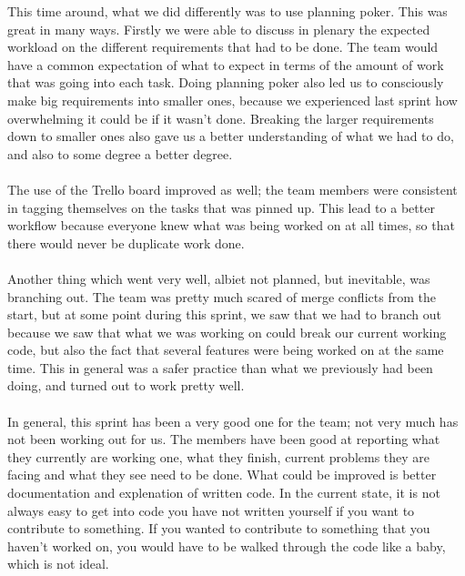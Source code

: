\documentclass{article}
\begin{document}
\maketitle

This time around, what we did differently was to use planning poker. This was great in many ways. Firstly we were able to discuss in plenary the expected workload on the different requirements that had to be done. The team would have a common expectation of what to expect in terms of the amount of work that was going into each task. Doing planning poker also led us to consciously make big requirements into smaller ones, because we experienced last sprint how overwhelming it could be if it wasn't done. Breaking the larger requirements down to smaller ones also gave us a better understanding of what we had to do, and also to some degree a better degree.\\\\
The use of the Trello board improved as well; the team members were consistent in tagging themselves on the tasks that was pinned up. This lead to a better workflow because everyone knew what was being worked on at all times, so that there would never be duplicate work done.\\\\
Another thing which went very well, albiet not planned, but inevitable, was branching out. The team was pretty much scared of merge conflicts from the start, but at some point during this sprint, we saw that we had to branch out because we saw that what we was working on could break our current working code, but also the fact that several features were being worked on at the same time. This in general was a safer practice than what we previously had been doing, and turned out to work pretty well.\\\\
In general, this sprint has been a very good one for the team; not very much has not been working out for us. The members have been good at reporting what they currently are working one, what they finish, current problems they are facing and what they see need to be done. What could be improved is better documentation and explenation of written code. In the current state, it is not always easy to get into code you have not written yourself if you want to contribute to something. If you wanted to contribute to something that you haven't worked on, you would have to be walked through the code like a baby, which is not ideal.
\end{document}
